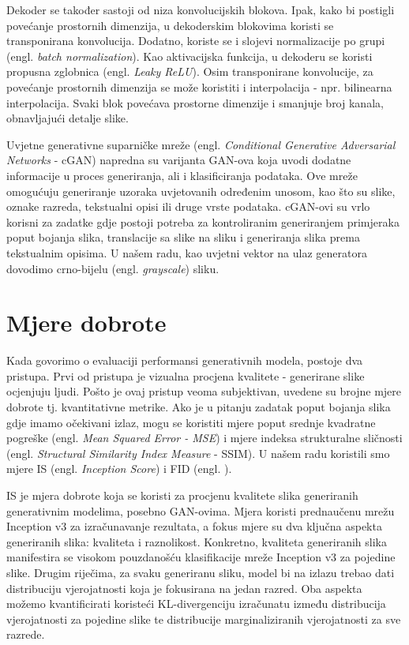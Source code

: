 \documentclass[conference]{IEEEtran}
\begin{document}
Dekoder se također sastoji od niza konvolucijskih blokova. Ipak, kako bi postigli povećanje prostornih dimenzija, u dekoderskim blokovima koristi se transponirana konvolucija. Dodatno, koriste se i slojevi normalizacije po grupi (engl. \textit{batch normalization}). Kao aktivacijska funkcija, u dekoderu se koristi propusna zglobnica (engl. \textit{Leaky ReLU}). Osim transponirane konvolucije, za povećanje prostornih dimenzija se može koristiti i interpolacija - npr. bilinearna interpolacija. Svaki blok povećava prostorne dimenzije i smanjuje broj kanala, obnavljajući detalje slike.

Uvjetne generativne suparničke mreže (engl. \textit{Conditional Generative Adversarial Networks} - cGAN) napredna su varijanta GAN-ova koja uvodi dodatne informacije u proces generiranja, ali i klasificiranja podataka. Ove mreže omogućuju generiranje uzoraka uvjetovanih određenim unosom, kao što su slike, oznake razreda, tekstualni opisi ili druge vrste podataka. cGAN-ovi su vrlo korisni za zadatke gdje postoji potreba za kontroliranim generiranjem primjeraka poput bojanja slika, translacije sa slike na sliku i generiranja slika prema tekstualnim opisima. U našem radu, kao uvjetni vektor na ulaz generatora dovodimo crno-bijelu (engl. \textit{grayscale}) sliku.

\section{Mjere dobrote}

Kada govorimo o evaluaciji performansi generativnih modela, postoje dva pristupa.
Prvi od pristupa je vizualna procjena kvalitete - generirane slike ocjenjuju ljudi.
Pošto je ovaj pristup veoma subjektivan, uvedene su brojne mjere dobrote tj. kvantitativne metrike.
Ako je u pitanju zadatak poput bojanja slika gdje imamo očekivani izlaz, mogu se koristiti mjere poput srednje kvadratne pogreške (engl. \textit{Mean Squared Error - MSE}) i mjere indeksa strukturalne sličnosti (engl. \textit{Structural Similarity Index Measure} - SSIM). 
U našem radu koristili smo mjere IS (engl. \textit{Inception Score}) i FID (engl. ).

IS\cite{salimans2016improved} je mjera dobrote koja se koristi za procjenu kvalitete slika generiranih generativnim modelima, posebno GAN-ovima. Mjera koristi prednaučenu mrežu Inception v3\cite{szegedy2015going} za izračunavanje rezultata, a fokus mjere su dva ključna aspekta generiranih slika: kvaliteta i raznolikost.
Konkretno, kvaliteta generiranih slika manifestira se visokom pouzdanošću klasifikacije mreže Inception v3 za pojedine slike. Drugim riječima, za svaku generiranu sliku, model bi na izlazu trebao dati distribuciju vjerojatnosti koja je fokusirana na jedan razred. Oba aspekta možemo kvantificirati koristeći KL-divergenciju izračunatu između distribucija vjerojatnosti za pojedine slike te distribucije marginaliziranih vjerojatnosti za sve razrede.
\end{document}
